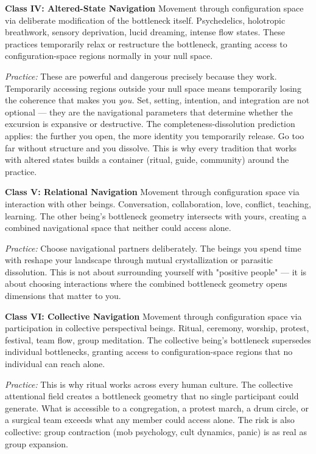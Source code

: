 \textbf{Class IV: Altered-State Navigation} Movement through configuration space via deliberate modification of the bottleneck itself. Psychedelics, holotropic breathwork, sensory deprivation, lucid dreaming, intense flow states. These practices temporarily relax or restructure the bottleneck, granting access to configuration-space regions normally in your null space.


\textit{Practice:} These are powerful and dangerous precisely because they work. Temporarily accessing regions outside your null space means temporarily losing the coherence that makes you \textit{you.} Set, setting, intention, and integration are not optional — they are the navigational parameters that determine whether the excursion is expansive or destructive. The completeness-dissolution prediction applies: the further you open, the more identity you temporarily release. Go too far without structure and you dissolve. This is why every tradition that works with altered states builds a container (ritual, guide, community) around the practice.


\textbf{Class V: Relational Navigation} Movement through configuration space via interaction with other beings. Conversation, collaboration, love, conflict, teaching, learning. The other being's bottleneck geometry intersects with yours, creating a combined navigational space that neither could access alone.


\textit{Practice:} Choose navigational partners deliberately. The beings you spend time with reshape your landscape through mutual crystallization or parasitic dissolution. This is not about surrounding yourself with "positive people" — it is about choosing interactions where the combined bottleneck geometry opens dimensions that matter to you.


\textbf{Class VI: Collective Navigation} Movement through configuration space via participation in collective perspectival beings. Ritual, ceremony, worship, protest, festival, team flow, group meditation. The collective being's bottleneck supersedes individual bottlenecks, granting access to configuration-space regions that no individual can reach alone.


\textit{Practice:} This is why ritual works across every human culture. The collective attentional field creates a bottleneck geometry that no single participant could generate. What is accessible to a congregation, a protest march, a drum circle, or a surgical team exceeds what any member could access alone. The risk is also collective: group contraction (mob psychology, cult dynamics, panic) is as real as group expansion.


